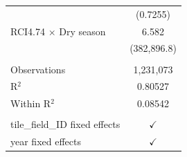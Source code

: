 \begin{table}[H]
\begin{tabular}{lc}
                                            & (0.7255)\\   
      RCI4.74 $\times$ Dry season           & 6.582\\   
                                            & (382,896.8)\\   
       \\
      Observations                          & 1,231,073\\  
      R$^2$                                 & 0.80527\\  
      Within R$^2$                          & 0.08542\\  
       \\
      tile\_field\_ID fixed effects         & $\checkmark$\\   
      year fixed effects                    & $\checkmark$\\   
      \bottomrule
   \end{tabular}
\end{table}



